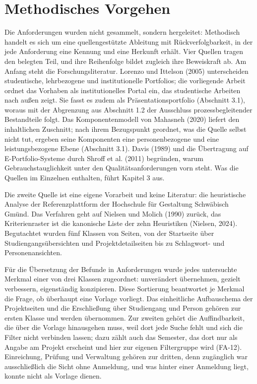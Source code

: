 \section{Methodisches Vorgehen}
\label{sec:methodisches-vorgehen}

Die Anforderungen wurden nicht gesammelt, sondern hergeleitet: Methodisch handelt es sich um eine quellengestützte Ableitung mit Rückverfolgbarkeit, in der jede Anforderung eine Kennung und eine Herkunft erhält. Vier Quellen tragen den belegten Teil, und ihre Reihenfolge bildet zugleich ihre Beweiskraft ab. Am Anfang steht die Forschungsliteratur. Lorenzo und Ittelson (2005) unterscheiden studentische, lehrbezogene und institutionelle Portfolios; die vorliegende Arbeit ordnet das Vorhaben als institutionelles Portal ein, das studentische Arbeiten nach außen zeigt. Sie fasst es zudem als Präsentationsportfolio (Abschnitt 3.1), woraus mit der Abgrenzung aus Abschnitt 1.2 der Ausschluss prozessbegleitender Bestandteile folgt. Das Komponentenmodell von Mahasneh (2020) liefert den inhaltlichen Zuschnitt; nach ihrem Bezugspunkt geordnet, was die Quelle selbst nicht tut, ergeben seine Komponenten eine personenbezogene und eine leistungsbezogene Ebene (Abschnitt 3.1). Davis (1989) und die Übertragung auf E-Portfolio-Systeme durch Shroff et al. (2011) begründen, warum Gebrauchstauglichkeit unter den Qualitätsanforderungen vorn steht. Was die Quellen im Einzelnen enthalten, führt Kapitel 3 aus.

Die zweite Quelle ist eine eigene Vorarbeit und keine Literatur: die heuristische Analyse der Referenzplattform der Hochschule für Gestaltung Schwäbisch Gmünd. Das Verfahren geht auf Nielsen und Molich (1990) zurück, das Kriterienraster ist die kanonische Liste der zehn Heuristiken (Nielsen, 2024). Begutachtet wurden fünf Klassen von Seiten, von der Startseite über Studiengangsübersichten und Projektdetailseiten bis zu Schlagwort- und Personenansichten.

Für die Übersetzung der Befunde in Anforderungen wurde jedes untersuchte Merkmal einer von drei Klassen zugeordnet: unverändert übernehmen, gezielt verbessern, eigenständig konzipieren. Diese Sortierung beantwortet je Merkmal die Frage, ob überhaupt eine Vorlage vorliegt. Das einheitliche Aufbauschema der Projektseiten und die Erschließung über Studiengang und Person gehören zur ersten Klasse und werden übernommen. Zur zweiten gehört die Auffindbarkeit, die über die Vorlage hinausgehen muss, weil dort jede Suche fehlt und sich die Filter nicht verbinden lassen; dazu zählt auch das Semester, das dort nur als Angabe am Projekt erscheint und hier zur eigenen Filtergruppe wird (FA-12). Einreichung, Prüfung und Verwaltung gehören zur dritten, denn zugänglich war ausschließlich die Sicht ohne Anmeldung, und was hinter einer Anmeldung liegt, konnte nicht als Vorlage dienen.


